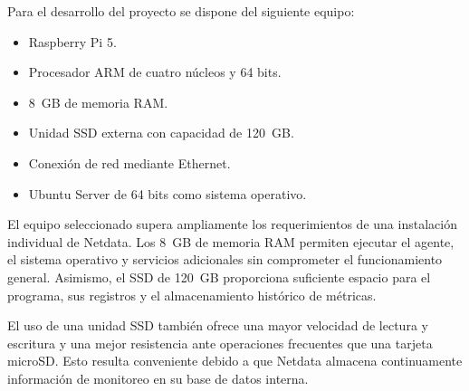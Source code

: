 Para el desarrollo del proyecto se dispone del siguiente equipo:

\begin{itemize}
    \item Raspberry Pi 5.
    \item Procesador ARM de cuatro núcleos y 64 bits.
    \item 8~GB de memoria RAM.
    \item Unidad SSD externa con capacidad de 120~GB.
    \item Conexión de red mediante Ethernet.
    \item Ubuntu Server de 64 bits como sistema operativo.
\end{itemize}

El equipo seleccionado supera ampliamente los requerimientos de una instalación individual de Netdata. Los 8~GB de memoria RAM permiten ejecutar el agente, el sistema operativo y servicios adicionales sin comprometer el funcionamiento general. Asimismo, el SSD de 120~GB proporciona suficiente espacio para el programa, sus registros y el almacenamiento histórico de métricas.

El uso de una unidad SSD también ofrece una mayor velocidad de lectura y escritura y una mejor resistencia ante operaciones frecuentes que una tarjeta microSD. Esto resulta conveniente debido a que Netdata almacena continuamente información de monitoreo en su base de datos interna.